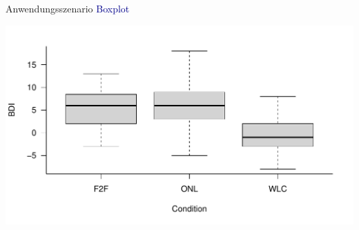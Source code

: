 \documentclass[
  8pt,
  ignorenonframetext,
]{beamer}
\begin{document}
\begin{frame}{Anwendungsszenario}
\protect\hypertarget{anwendungsszenario-3}{}
\textcolor{darkblue}{Boxplot} \vspace{4mm}

\begin{center}\includegraphics[width=0.95\linewidth]{10_Abbildungen/alm_10_aov_1_boxplot} \end{center}
\end{frame}
\end{document}
